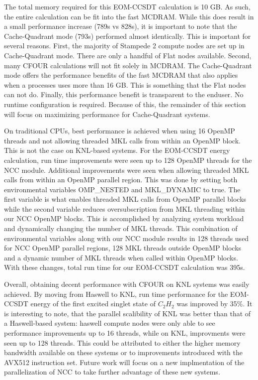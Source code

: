 The total memory required for this EOM-CCSDT calculation is 10 GB. As such, the entire calculation can
be fit into the fast MCDRAM. While this does result in a small performance increase (789s vs 828s), it is important
to note that the Cache-Quadrant mode (793s) performed almost identically. This is important for several reasons. First,
the majority of Stampede 2 compute nodes are set up in Cache-Quadrant mode. There are only a handful of Flat nodes
available. Second, many CFOUR calculations will not fit solely in MCDRAM. The Cache-Quadrant mode offers the 
performance benefits of the fast MCDRAM that also applies when a processes uses more than 16 GB. This is something
that the Flat nodes can not do. Finally, this performance benefit is transparent to the enduser. No runtime 
configuration is required. Because of this, the remainder of this section will focus on maximizing performance 
for Cache-Quadrant systems.

On traditional CPUs, best performance is achieved when using 16 OpenMP threads and not allowing threaded MKL calls
from within an OpenMP block. This is not the case on KNL-based systems. For the EOM-CCSDT energy calculation, 
run time improvements were seen up to 128 OpenMP threads for the NCC module. Additional improvements were seen
when allowing threaded MKL calls from within an OpenMP parallel region. This was done by setting both environmental
variables OMP\_NESTED and MKL\_DYNAMIC to true. The first variable is what enables threaded MKL calls from OpenMP
parallel blocks while the second variable reduces oversubscription from MKL threading within our NCC OpenMP blocks.
This is accomplished by analyzing system workload and dynamically changing the number of MKL threads. This 
combination of environmental variables along with our NCC module results in 128 threads used for NCC OpenMP parallel
regions, 128 MKL threads outside OpenMP blocks and a dynamic number of MKL threads when called within OpenMP blocks.
With these changes, total run time for our EOM-CCSDT calculation was 395s.

Overall, obtaining decent performance with CFOUR on KNL systems was easily achieved. By moving from Haswell to 
KNL, run time performance for the EOM-CCSDT energy of the first excited singlet state of $C_2H_2$ was improved
by 35\%. It is interesting to note, that the parallel scalibility of KNL was better than that of a Haswell-based
system: haswell compute nodes were only able to see performance improvements up to 16 threads, while on KNL,
improvments were seen up to 128 threads. This could be attributed to either the higher memory bandwidth available
on these systems or to improvements introduced with the AVX512 instruction set. Future work will focus on a new
implmentation of the parallelization of NCC to take further advantage of these new systems.

